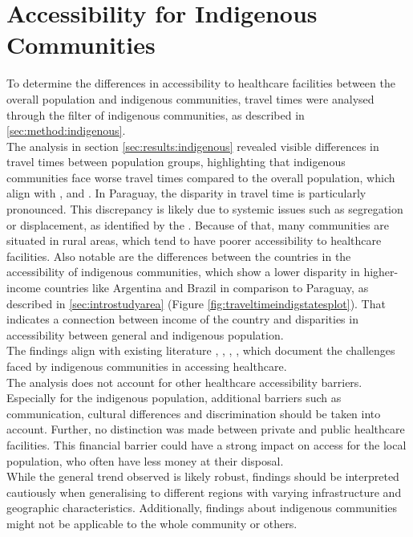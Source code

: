 \documentclass[11pt, a4paper]{report}
\begin{document}
\section{Accessibility for Indigenous Communities}

To determine the differences in accessibility to healthcare facilities between the overall population and indigenous communities, travel times were analysed through the filter of indigenous communities, as described in \ref{sec:method:indigenous}. \\
%
The analysis in section \ref{sec:results:indigenous} revealed visible differences in travel times between population groups, highlighting that indigenous communities face worse travel times compared to the overall population, which align with \citet{quintana_access_2021}, \citet{world_health_organization_access_2024} and \citet{santos_health_2022}. In Paraguay, the disparity in travel time is particularly pronounced. This discrepancy is likely due to systemic issues such as segregation or displacement, as identified by the \citet{united_nations_situation_2015}. Because of that, many communities are situated in rural areas, which tend to have poorer accessibility to healthcare facilities. Also notable are the differences between the countries in the accessibility of indigenous communities,  which show a lower disparity in higher-income countries like Argentina and Brazil in comparison to Paraguay, as described in \ref{sec:introstudyarea} (Figure \ref{fig:traveltimeindigstatesplot}). That indicates a connection between income of the country and disparities in accessibility between general and indigenous population. \\
%
The findings align with existing literature \citet{davy_access_2016}, \citet{quintana_access_2021}, \citet{santos_health_2022}, \citet{world_health_organization_access_2024}, which document the challenges faced by indigenous communities in accessing healthcare. \\
%
The analysis does not account for other healthcare accessibility barriers. Especially for the indigenous population, additional barriers such as communication, cultural differences and discrimination should be taken into account. Further, no distinction was made between private and public healthcare facilities. This financial barrier could have a strong impact on access for the local population, who often have less money at their disposal. \\
%
While the general trend observed is likely robust, findings should be interpreted cautiously when generalising to different regions with varying infrastructure and geographic characteristics. Additionally, findings about indigenous communities might not be applicable to the whole community or others.\\
\end{document}
